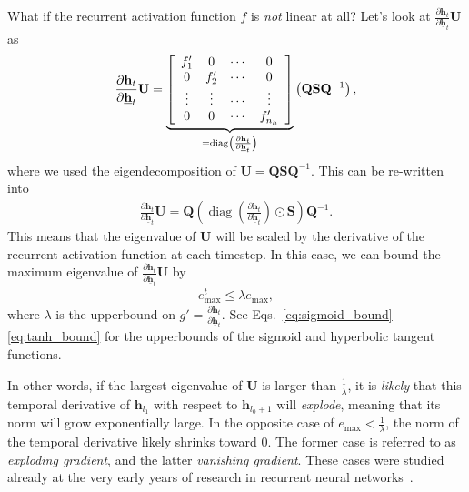 \documentclass{report}
\newcommand{\vect}[1]{\mathbf{#1}}
\newcommand{\matr}[1]{\mathbf{#1}}
\newcommand{\diag}[0]{\operatorname{diag}}
\newcommand{\vh}[0]{\vect{h}}
\newcommand{\mQ}[0]{\matr{Q}}
\newcommand{\mU}[0]{\matr{U}}
\newcommand{\mS}{\matr{S}}
\begin{document}
What if the recurrent activation function $f$ is {\em not} linear at all? Let's
look at $\frac{\partial \vh_{t}}{\partial \underline{\vh}_{t}} \mU$ as 
\begin{align*}
    \frac{\partial \vh_{t}}{\partial \underline{\vh}_{t}} \mU = 
        \underbrace{
    \left[ 
            \begin{array}{c c c c}
                f_1' & 0 & \cdots & 0 \\
                0 & f_2' & \cdots & 0 \\
                \vdots & \vdots & \cdots & \vdots \\
                0 & 0 & \cdots & f_{n_h}'
            \end{array}
    \right] 
        }_{=\diag\left( \frac{\partial \vh_{t}}{\partial \underline{\vh}_{t}}\right)}
    \left(\mQ \mS \mQ^{-1}\right),
\end{align*}
where we used the eigendecomposition of $\mU=\mQ \mS \mQ^{-1}$. This can be
re-written into
\begin{align*}
    \frac{\partial \vh_{t}}{\partial \underline{\vh}_{t}} \mU = 
    \mQ \left( \diag\left(\frac{\partial \vh_{t}}{\partial
            \underline{\vh}_{t}}\right)
    \odot \mS \right) \mQ^{-1}.
\end{align*}
This means that the eigenvalue of $\mU$ will be scaled by the derivative of the
recurrent activation function at each timestep. In this case, we can bound the
maximum eigenvalue of $\frac{\partial \vh_{t}}{\partial \underline{\vh}_{t}}
\mU$ by
\begin{align*}
    e_{\max}^t \leq \lambda e_{\max},
\end{align*}
where $\lambda$ is the upperbound on $g'=\frac{\partial \vh_{t}}{\partial
\underline{\vh}_{t}}$. See Eqs.~\eqref{eq:sigmoid_bound}--\eqref{eq:tanh_bound}
for the upperbounds of the sigmoid and hyperbolic tangent functions.

In other words, if the largest eigenvalue of $\mU$ is larger than
$\frac{1}{\lambda}$, it is {\em likely} that this temporal derivative of
$\vh_{l_1}$ with respect to $\vh_{l_0+1}$ will {\em explode}, meaning that its
norm will grow exponentially large. In the opposite case of $e_{\max} <
\frac{1}{\lambda}$, the norm of the temporal derivative likely shrinks toward
$0$. The former case is referred to as {\em exploding gradient}, and the latter
{\em vanishing gradient}. These cases were studied already at the very early
years of research in recurrent neural
networks~\cite{bengio1994learning,hochreiter2001gradient}.
\end{document}
